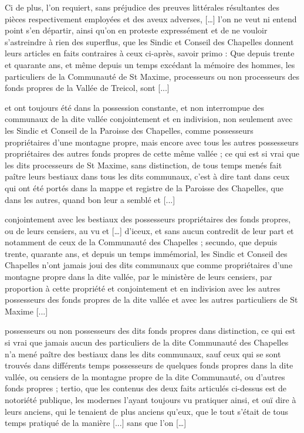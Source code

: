 \documentclass[a4paper,twoside,openany]{article}
\begin{document}

Ci de plus, l'on requiert, sans préjudice des preuves littérales résultantes des pièces respectivement employées et des aveux adverses, […] l’on ne veut ni entend point s'en départir, ainsi qu'on en proteste expressément et de ne vouloir s'astreindre à rien des superflus, que les Sindic et Conseil des Chapelles donnent leurs articles en faits contraires à ceux ci-après, savoir primo : Que depuis trente et quarante ans, et même depuis un temps excédant la mémoire des hommes, les particuliers de la Communauté de St Maxime, processeurs ou non processeurs des fonds propres de la Vallée de Treicol, sont [...]

 et ont toujours été dans la possession constante, et non interrompue des communaux de la dite vallée conjointement et en indivision, non seulement avec les Sindic et Conseil de la Paroisse des Chapelles, comme possesseurs propriétaires d'une montagne propre, mais encore avec tous les autres possesseurs propriétaires des autres fonds propres de cette même vallée ; ce qui est si vrai que les dits processeurs de St Maxime, sans distinction, de tous temps menés fait paître leurs bestiaux dans tous les dits communaux, c'est à dire tant dans ceux qui ont été portés dans la mappe et registre de la Paroisse des Chapelles, que dans les autres, quand bon leur a semblé et [...]


conjointement avec les bestiaux des possesseurs propriétaires des fonds propres, ou de leurs censiers, au vu et […] d'iceux, et sans aucun contredit de leur part et notamment de ceux de la Communauté des Chapelles ; secundo, que depuis trente, quarante ans, et depuis un temps immémorial, les Sindic et Conseil des Chapelles n'ont jamais joui des dits communaux que comme propriétaires d'une montagne propre dans la dite vallée, par le ministère de leurs censiers, par proportion à cette propriété et conjointement et en indivision avec les autres possesseurs des fonds propres de la dite vallée et avec les autres particuliers de St Maxime [...]

possesseurs ou non possesseurs des dits fonds propres dans distinction, ce qui est si vrai que jamais aucun des particuliers de la dite Communauté des Chapelles n'a mené paître des bestiaux dans les dits communaux, sauf ceux qui se sont trouvés dans différents temps possesseurs de quelques fonds propres dans la dite vallée, ou censiers de la montagne propre de la dite Communauté, ou d'autres fonds propres ; tertio, que les contenus des deux faits articulés ci-dessus est de notoriété publique, les modernes l'ayant toujours vu pratiquer ainsi, et ouï dire à leurs anciens, qui le tenaient de plus anciens qu'eux, que le tout s’était de tous temps pratiqué de la manière [...] sans que l’on […]
\end{document}
